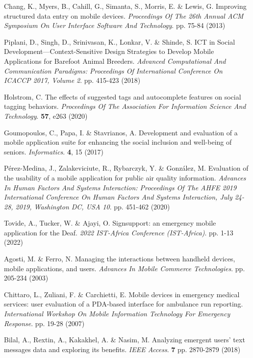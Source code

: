 \documentclass[preprint,12pt]{elsarticle}
\begin{document}
\begin{thebibliography}{99}
Chang, K., Myers, B., Cahill, G., Simanta, S., Morris, E. \& Lewis, G. Improving structured data entry on mobile devices. {\em Proceedings Of The 26th Annual ACM Symposium On User Interface Software And Technology}. pp. 75-84 (2013)

Piplani, D., Singh, D., Srinivasan, K., Lonkar, V. \& Shinde, S. ICT in Social Development—Context-Sensitive Design Strategies to Develop Mobile Applications for Barefoot Animal Breeders. {\em Advanced Computational And Communication Paradigms: Proceedings Of International Conference On ICACCP 2017, Volume 2}. pp. 415-423 (2018)

Holstrom, C. The effects of suggested tags and autocomplete features on social tagging behaviors. {\em Proceedings Of The Association For Information Science And Technology}. \textbf{57}, e263 (2020)

Goumopoulos, C., Papa, I. \& Stavrianos, A. Development and evaluation of a mobile application suite for enhancing the social inclusion and well-being of seniors. {\em Informatics}. \textbf{4}, 15 (2017)

Pérez-Medina, J., Zalakeviciute, R., Rybarczyk, Y. \& González, M. Evaluation of the usability of a mobile application for public air quality information. {\em Advances In Human Factors And Systems Interaction: Proceedings Of The AHFE 2019 International Conference On Human Factors And Systems Interaction, July 24-28, 2019, Washington DC, USA 10}. pp. 451-462 (2020)

Tovide, A., Tucker, W. \& Ajayi, O. Signsupport: an emergency mobile application for the Deaf. {\em 2022 IST-Africa Conference (IST-Africa)}. pp. 1-13 (2022)

Agosti, M. \& Ferro, N. Managing the interactions between handheld devices, mobile applications, and users. {\em Advances In Mobile Commerce Technologies}. pp. 205-234 (2003)

Chittaro, L., Zuliani, F. \& Carchietti, E. Mobile devices in emergency medical services: user evaluation of a PDA-based interface for ambulance run reporting. {\em International Workshop On Mobile Information Technology For Emergency Response}. pp. 19-28 (2007)

Bilal, A., Rextin, A., Kakakhel, A. \& Nasim, M. Analyzing emergent users’ text messages data and exploring its benefits. {\em IEEE Access}. \textbf{7} pp. 2870-2879 (2018)


\end{thebibliography}
\end{document}

